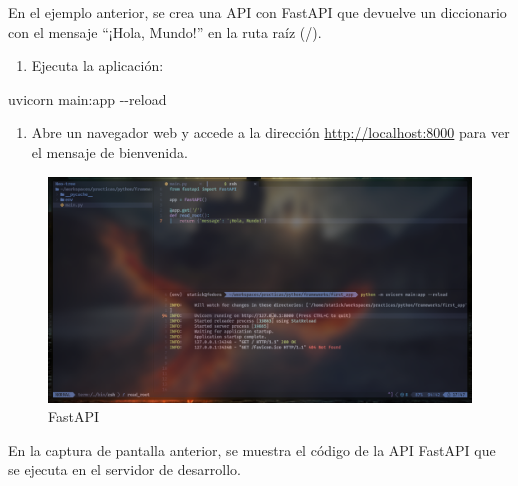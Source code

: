\documentclass[
  a4paper,
  DIV=11,
  numbers=noendperiod,
  onepage,
  openany]{scrreprt}
\newenvironment{Shaded}{\begin{snugshade}}{\end{snugshade}}
\newcommand{\AttributeTok}[1]{\textcolor[rgb]{0.40,0.45,0.13}{#1}}
\newcommand{\ExtensionTok}[1]{\textcolor[rgb]{0.00,0.23,0.31}{#1}}
\newcommand{\NormalTok}[1]{\textcolor[rgb]{0.00,0.23,0.31}{#1}}
\providecommand{\tightlist}{%
  \setlength{\itemsep}{0pt}\setlength{\parskip}{0pt}}\usepackage{longtable,booktabs,array}
\begin{document}
En el ejemplo anterior, se crea una API con FastAPI que devuelve un
diccionario con el mensaje ``¡Hola, Mundo!'' en la ruta raíz (/).

\begin{enumerate}
\def\labelenumi{\arabic{enumi}.}
\setcounter{enumi}{2}
\tightlist
\item
  Ejecuta la aplicación:
\end{enumerate}

\begin{Shaded}
\begin{Highlighting}[]
\ExtensionTok{uvicorn}\NormalTok{ main:app }\AttributeTok{{-}{-}reload}
\end{Highlighting}
\end{Shaded}

\begin{enumerate}
\def\labelenumi{\arabic{enumi}.}
\setcounter{enumi}{3}
\tightlist
\item
  Abre un navegador web y accede a la dirección
  \url{http://localhost:8000} para ver el mensaje de bienvenida.
\end{enumerate}

\begin{figure}[H]

{\centering \includegraphics[width=8.33333in,height=\textheight,keepaspectratio]{unidades/unidad7/./images/fastapi_code1.png}

}

\caption{FastAPI}

\end{figure}%

En la captura de pantalla anterior, se muestra el código de la API
FastAPI que se ejecuta en el servidor de desarrollo.
\end{document}
